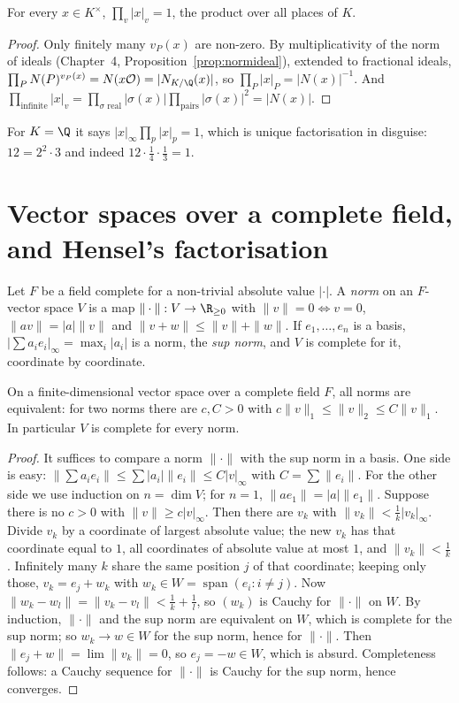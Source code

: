 \begin{proposition}\label{prop:productformula}
For every $x\in K^\times$, $\displaystyle\prod_v|x|_v=1$, the product over all places of $K$.
\end{proposition}
\begin{proof}
Only finitely many $v_P(x)$ are non-zero. By multiplicativity of the norm of ideals (Chapter~4, Proposition~\ref{prop:normideal}),
extended to fractional ideals, $\prod_PN(P)^{v_P(x)}=N(x\mathcal O)=|N_{K/\Q}(x)|$, so $\prod_P|x|_P=|N(x)|^{-1}$. And
$\prod_{\text{infinite}}|x|_v=\prod_{\sigma\text{ real}}|\sigma(x)|\prod_{\text{pairs}}|\sigma(x)|^2=|N(x)|$.
\end{proof}

For $K=\Q$ it says $|x|_\infty\prod_p|x|_p=1$, which is unique factorisation in disguise: $12=2^2\cdot3$ and indeed
$12\cdot\frac14\cdot\frac13=1$.

\section{Vector spaces over a complete field, and Hensel's factorisation}

Let $F$ be a field complete for a non-trivial absolute value $|\cdot|$. A \emph{norm} on an $F$-vector space $V$ is a map
$\|\cdot\|:V\to\R_{\ge0}$ with $\|v\|=0\iff v=0$, $\|av\|=|a|\|v\|$ and $\|v+w\|\le\|v\|+\|w\|$. If $e_1,\dots,e_n$ is a basis,
$|\sum a_ie_i|_\infty=\max_i|a_i|$ is a norm, the \emph{sup norm}, and $V$ is complete for it, coordinate by coordinate.

\begin{theorem}\label{thm:normequiv}
On a finite-dimensional vector space over a complete field $F$, all norms are equivalent: for two norms there are $c,C>0$
with $c\|v\|_1\le\|v\|_2\le C\|v\|_1$. In particular $V$ is complete for every norm.
\end{theorem}
\begin{proof}
It suffices to compare a norm $\|\cdot\|$ with the sup norm in a basis. One side is easy: $\|\sum a_ie_i\|\le\sum|a_i|\|e_i\|
\le C|v|_\infty$ with $C=\sum\|e_i\|$. For the other side we use induction on $n=\dim V$; for $n=1$, $\|ae_1\|=|a|\|e_1\|$.
Suppose there is no $c>0$ with $\|v\|\ge c|v|_\infty$. Then there are $v_k$ with $\|v_k\|<\frac1k|v_k|_\infty$. Divide $v_k$ by
a coordinate of largest absolute value; the new $v_k$ has that coordinate equal to $1$, all coordinates of absolute value at
most $1$, and $\|v_k\|<\frac1k$. Infinitely many $k$ share the same position $j$ of that coordinate; keeping only those,
$v_k=e_j+w_k$ with $w_k\in W=\operatorname{span}(e_i:i\ne j)$. Now $\|w_k-w_l\|=\|v_k-v_l\|<\frac1k+\frac1l$, so $(w_k)$ is Cauchy for
$\|\cdot\|$ on $W$. By induction, $\|\cdot\|$ and the sup norm are equivalent on $W$, which is complete for the sup norm; so
$w_k\to w\in W$ for the sup norm, hence for $\|\cdot\|$. Then $\|e_j+w\|=\lim\|v_k\|=0$, so $e_j=-w\in W$, which is absurd.
Completeness follows: a Cauchy sequence for $\|\cdot\|$ is Cauchy for the sup norm, hence converges.
\end{proof}


